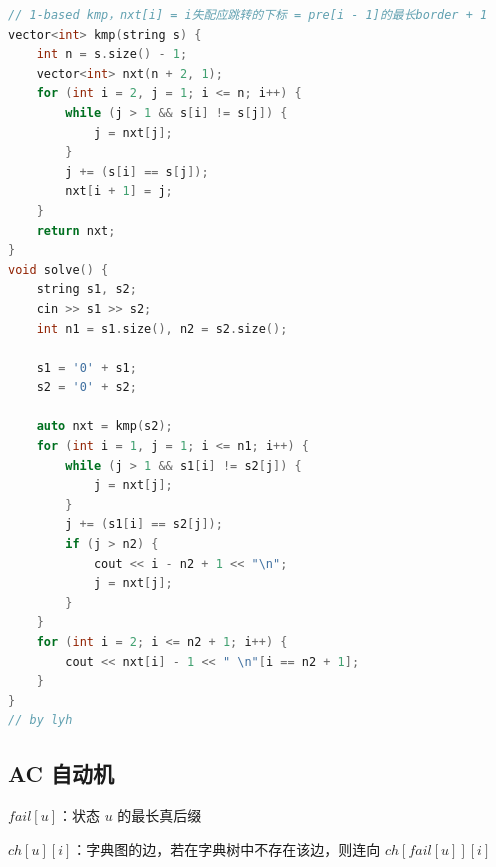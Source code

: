 \begin{lstlisting}[language = C++]
// 1-based kmp，nxt[i] = i失配应跳转的下标 = pre[i - 1]的最长border + 1
vector<int> kmp(string s) {
    int n = s.size() - 1;
    vector<int> nxt(n + 2, 1);
    for (int i = 2, j = 1; i <= n; i++) {
        while (j > 1 && s[i] != s[j]) {
            j = nxt[j];
        }
        j += (s[i] == s[j]);
        nxt[i + 1] = j;
    }
    return nxt;
}
void solve() {
    string s1, s2;
    cin >> s1 >> s2;
    int n1 = s1.size(), n2 = s2.size();

    s1 = '0' + s1;
    s2 = '0' + s2;

    auto nxt = kmp(s2);
    for (int i = 1, j = 1; i <= n1; i++) {
        while (j > 1 && s1[i] != s2[j]) {
            j = nxt[j];
        }
        j += (s1[i] == s2[j]);
        if (j > n2) {
            cout << i - n2 + 1 << "\n";
            j = nxt[j];
        }
    }
    for (int i = 2; i <= n2 + 1; i++) {
        cout << nxt[i] - 1 << " \n"[i == n2 + 1];
    }
}
// by lyh
\end{lstlisting}

\subsection{AC 自动机}

$fail[u]$：状态 $u$ 的最长真后缀

$ch[u][i]$：字典图的边，若在字典树中不存在该边，则连向 $ch[fail[u]][i]$

